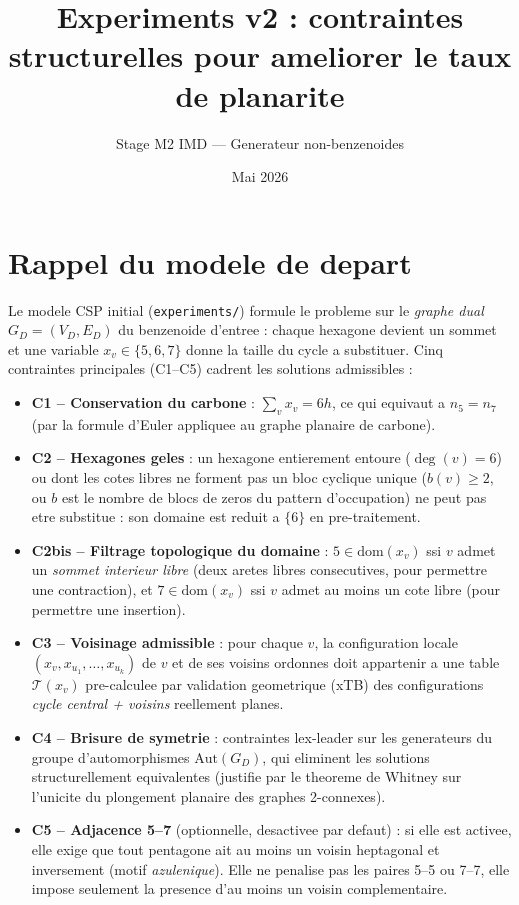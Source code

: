 \documentclass[11pt,a4paper]{article}
\title{Experiments v2 : contraintes structurelles pour ameliorer le taux de planarite}
\author{Stage M2 IMD --- Generateur non-benzenoides}
\date{Mai 2026}
\begin{document}
\maketitle

\section{Rappel du modele de depart}

Le modele CSP initial (\texttt{experiments/}) formule le probleme sur le
\emph{graphe dual} $G_D = (V_D, E_D)$ du benzenoide d'entree : chaque
hexagone devient un sommet et une variable
$x_v \in \{5, 6, 7\}$ donne la taille du cycle a substituer. Cinq
contraintes principales (C1--C5) cadrent les solutions admissibles :
\begin{itemize}[leftmargin=*,itemsep=2pt]
  \item \textbf{C1 -- Conservation du carbone} :
        $\sum_v x_v = 6h$, ce qui equivaut a $n_5 = n_7$ (par la
        formule d'Euler appliquee au graphe planaire de carbone).
  \item \textbf{C2 -- Hexagones geles} :
        un hexagone entierement entoure ($\deg(v) = 6$) ou dont les
        cotes libres ne forment pas un bloc cyclique unique
        ($b(v) \ge 2$, ou $b$ est le nombre de blocs de zeros du
        pattern d'occupation) ne peut pas etre substitue : son domaine
        est reduit a $\{6\}$ en pre-traitement.
  \item \textbf{C2bis -- Filtrage topologique du domaine} :
        $5 \in \text{dom}(x_v)$ ssi $v$ admet un \emph{sommet interieur
        libre} (deux aretes libres consecutives, pour permettre une
        contraction), et $7 \in \text{dom}(x_v)$ ssi $v$ admet au moins
        un cote libre (pour permettre une insertion).
  \item \textbf{C3 -- Voisinage admissible} :
        pour chaque $v$, la configuration locale
        $(x_v, x_{u_1}, \ldots, x_{u_k})$ de $v$ et de ses voisins
        ordonnes doit appartenir a une table $\mathcal{T}(x_v)$
        pre-calculee par validation geometrique (xTB) des
        configurations \emph{cycle central + voisins} reellement
        planes.
  \item \textbf{C4 -- Brisure de symetrie} :
        contraintes lex-leader sur les generateurs du groupe
        d'automorphismes $\mathrm{Aut}(G_D)$, qui eliminent les
        solutions structurellement equivalentes (justifie par le
        theoreme de Whitney sur l'unicite du plongement planaire des
        graphes 2-connexes).
  \item \textbf{C5 -- Adjacence 5--7} (optionnelle, desactivee par
        defaut) : si elle est activee, elle exige que tout pentagone
        ait au moins un voisin heptagonal et inversement (motif
        \emph{azulenique}). Elle ne penalise pas les paires 5--5 ou
        7--7, elle impose seulement la presence d'au moins un voisin
        complementaire.
\end{itemize}
\end{document}
